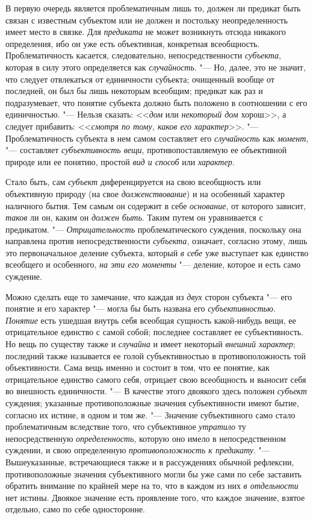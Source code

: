 {{\label{bkm:bm66a}В первую очередь является проблематичным лишь
то, должен ли предикат быть связан с известным субъектом или не должен и
постольку неопределенность имеет место в связке. Для
{\em предиката} не может
возникнуть отсюда никакого определения, ибо он уже есть объективная,
конкретная всеобщность. Проблематичность касается, следовательно,
непосредственности {\em субъекта},
которая в силу этого определяется как
{\em случайность}. "--- Но,
далее, это не значит, что следует отвлекаться от единичности субъекта;
очищенный вообще от последней, он был бы лишь некоторым всеобщим; предикат
как раз и подразумевает, что понятие субъекта должно быть положено в
соотношении с его единичностью. "--- Нельзя сказать:
<<{\em дом} или
{\em некоторый дом}
хорош>>, а следует прибавить:
<<{\em смотря по тому, каков его
характер}>>. "--- Проблематичность субъекта в нем самом
составляет его {\em случайность}
как {\em момент}, "---
составляет
{\em субъективность вещи},
противопоставляемую ее объективной природе или ее понятию,
простой {\em вид и способ}
или {\em характер}.

Стало быть, сам
{\em субъект}
диференцируется на свою всеобщность или объективную природу
(на свое {\em долженствование})
и на особенный характер наличного бытия. Тем самым он
содержит в себе {\em основание},
от которого зависит,
{\em таков} ли он, каким
он {\em должен быть}.
Таким путем он уравнивается с предикатом. "---
{\em Отрицательность}
проблематического суждения, поскольку она направлена против
непосредственности {\em субъекта},
означает, согласно этому, лишь это первоначальное деление
субъекта, который {\em в себе}
уже выступает как единство всеобщего и особенного,
{\em на эти его моменты}
"--- деление, которое и есть само суждение.

Можно сделать еще то замечание, что каждая из
{\em двух} сторон
субъекта "--- его понятие и его характер "--- могла
бы быть названа его
{\em субъективностью}.
\label{bkm:bm01a}{\em Понятие}
есть ушедшая внутрь себя всеобщая сущность какой-нибудь вещи,
ее отрицательное единство с самой собой; последнее составляет ее
субъективность. Но вещь по существу также и
{\em случайна} и имеет
некоторый {\em внешний характер};
последний также называется ее голой субъективностью в
противоположность той объективности. Сама вещь именно и состоит в том, что
ее понятие, как отрицательное единство самого себя, отрицает свою
всеобщность и выносит себя во внешность единичности. "--- В
качестве этого двоякого здесь положен
{\em субъект} суждения;
указанные противоположные значения субъективности имеют бытие, согласно их
истине, в одном и том же. "--- Значение субъективного само
стало проблематичным вследствие того, что субъективное
{\em утратило} ту
непосредственную {\em определенность},
которую оно имело в непосредственном суждении, и свою
определенную {\em противоположность к
предикату}. "--- Вышеуказанные, встречающиеся также и в
рассуждениях обычной рефлексии, противоположные значения субъективного
могли бы уже сами по себе заставить обратить внимание по крайней мере на
то, что в каждом из них {\em в
отдельности} нет истины. Двоякое значение есть проявление
того, что каждое значение, взятое отдельно, само по себе односторонне.

}}

